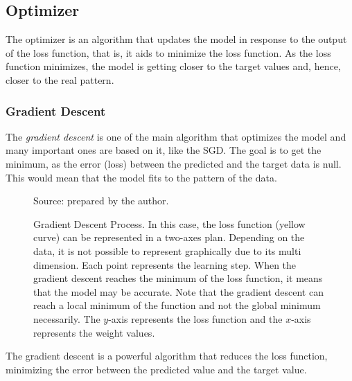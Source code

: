 
\subsection{Optimizer}\label{sec:optimizer}

The optimizer is an algorithm that updates the model in response to the output of the loss function, that is, it aids to minimize the loss function. 
As the loss function minimizes, the model is getting closer to the target values and, hence, closer to the real pattern.

\subsubsection*{Gradient Descent} 

The \emph{gradient descent} is one of the main algorithm \cite{nesterov2004} that optimizes the model and many important ones are based on it, like the SGD. 
The goal is to get the minimum, as the error (loss) between the predicted and the target data is null. 
This would mean that the model fits to the pattern of the data.
%
\begin{figure}[!htb]
    \centering
    \caption[Gradient Descent Process]{Gradient Descent Process. In this case, the loss function (yellow curve) can be represented in a two-axes plan. Depending on the data, it is not possible to represent graphically due to its multi dimension. Each point represents the learning step. When the gradient descent reaches the minimum of the loss function, it means that the model may be accurate. Note that the gradient descent can reach a local minimum of the function and not the global minimum necessarily. The \(y\)-axis represents the loss function and the \(x\)-axis represents the weight values.}
    
    
    {\footnotesize Source: prepared by the author.}
    
\end{figure}

The gradient descent is a powerful algorithm that reduces the loss function, minimizing the error between the predicted value and the target value.

